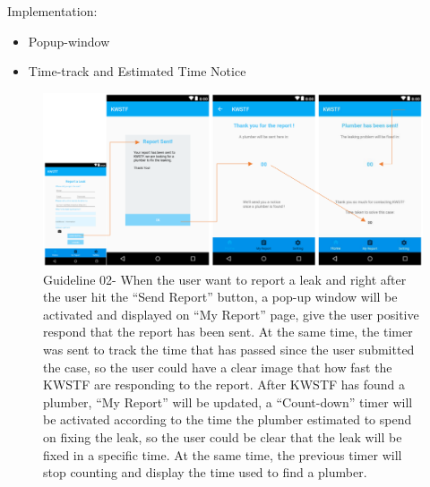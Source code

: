 \documentclass{article}
\begin{document}
\noindent
Implementation:
\begin{itemize}
\item Popup-window
\item Time-track and Estimated Time Notice
\end{itemize}
\begin{figure}[H]
\centering
\includegraphics[width=15cm]{files/figures/fig1_guide2.png}
\caption{Guideline 02- When the user want to report a leak and right after the user hit the “Send Report” button, a pop-up window will be
activated and displayed on “My Report” page, give the user positive respond that the report has been sent. At the same
time, the timer was sent to track the time that has passed since the user submitted the case, so the user could have a clear
image that how fast the KWSTF are responding to the report.
After KWSTF has found a plumber, “My Report” will be updated, a “Count-down” timer will be activated according to the
time the plumber estimated to spend on fixing the leak, so the user could be clear that the leak will be fixed in a specific
time. At the same time, the previous timer will stop counting and display the time used to find a plumber.}
\end{figure}
\end{document}
